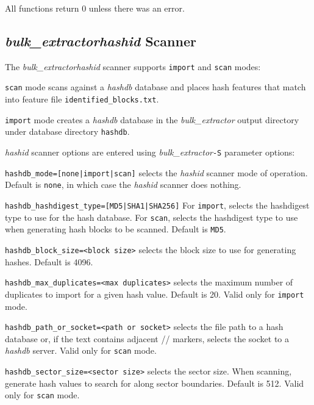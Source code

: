 \documentclass[12pt,twoside]{article}
\newcommand{\hdb}{\emph{hashdb}\xspace}
\newcommand{\bulk}{\emph{bulk\_extractor}\xspace}
\newcommand{\hid}{\emph{hashid}\xspace}
\begin{document}
All functions return 0 unless there was an error.


%

\subsection{\bulk \hid Scanner}
The \bulk \hid scanner supports \texttt{import} and \texttt{scan} modes:
\begin{compactitem}
\item \texttt{scan} mode scans against a \hdb database
and places hash features that match into feature file \texttt{identified\_blocks.txt}.
\item \texttt{import} mode creates a \hdb database
in the \bulk output directory under database directory \texttt{hashdb}.
\end{compactitem}

\hid scanner options are entered using \bulk \texttt{-S} parameter options:
\begin{compactitem}
\item \texttt{hashdb\_mode=[none|import|scan]}
selects the \hid scanner mode of operation.
Default is \texttt{none}, in which case the \hid scanner does nothing.
\item \texttt{hashdb\_hashdigest\_type=[MD5|SHA1|SHA256]}
For \texttt{import}, selects the hashdigest type to use for the hash database.
For \texttt{scan}, selects the hashdigest type to use
when generating hash blocks to be scanned.
Default is \texttt{MD5}.
\item \texttt{hashdb\_block\_size=<block size>}
selects the block size to use for generating hashes.
Default is 4096.
\item \texttt{hashdb\_max\_duplicates=<max duplicates>}
selects the maximum number of duplicates to import for a given hash value.
Default is 20.
Valid only for \texttt{import} mode.
\item \texttt{hashdb\_path\_or\_socket=<path or socket>}
selects the file path to a hash database
or, if the text contains adjacent // markers,
selects the socket to a \hdb server.
Valid only for \texttt{scan} mode.
\item \texttt{hashdb\_sector\_size=<sector size>}
selects the sector size.
When scanning, generate hash values to search for along sector boundaries.
Default is 512.
Valid only for \texttt{scan} mode.
\end{compactitem}
\end{document}
